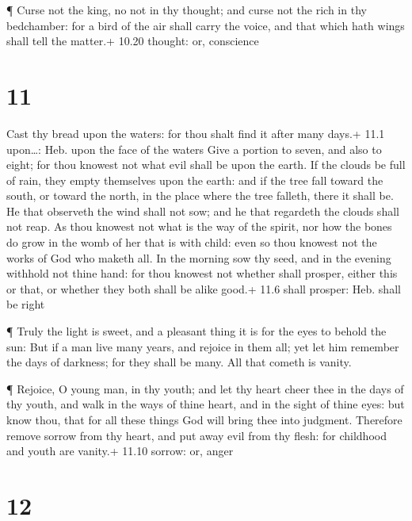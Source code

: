  ¶ Curse not the king, no not in thy thought; and curse not
the rich in thy bedchamber: for a bird of the air shall carry the voice,
and that which hath wings shall tell the matter.+ 10.20 thought: or,
conscience

\hypertarget{section-10}{%
\section{11}\label{section-10}}

 Cast thy bread upon the waters: for thou shalt find it
after many days.+ 11.1 upon\ldots: Heb. upon the face of the waters
 Give a portion to seven, and also to eight; for thou
knowest not what evil shall be upon the earth.  If the
clouds be full of rain, they empty themselves upon the earth: and if the
tree fall toward the south, or toward the north, in the place where the
tree falleth, there it shall be.  He that observeth the wind
shall not sow; and he that regardeth the clouds shall not reap.
 As thou knowest not what is the way of the spirit, nor how
the bones do grow in the womb of her that is with child: even so thou
knowest not the works of God who maketh all.  In the morning
sow thy seed, and in the evening withhold not thine hand: for thou
knowest not whether shall prosper, either this or that, or whether they
both shall be alike good.+ 11.6 shall prosper: Heb. shall be right

 ¶ Truly the light is sweet, and a pleasant thing it is for
the eyes to behold the sun:  But if a man live many years,
and rejoice in them all; yet let him remember the days of darkness; for
they shall be many. All that cometh is vanity.

 ¶ Rejoice, O young man, in thy youth; and let thy heart
cheer thee in the days of thy youth, and walk in the ways of thine
heart, and in the sight of thine eyes: but know thou, that for all these
things God will bring thee into judgment.  Therefore remove
sorrow from thy heart, and put away evil from thy flesh: for childhood
and youth are vanity.+ 11.10 sorrow: or, anger

\hypertarget{section-11}{%
\section{12}\label{section-11}}

